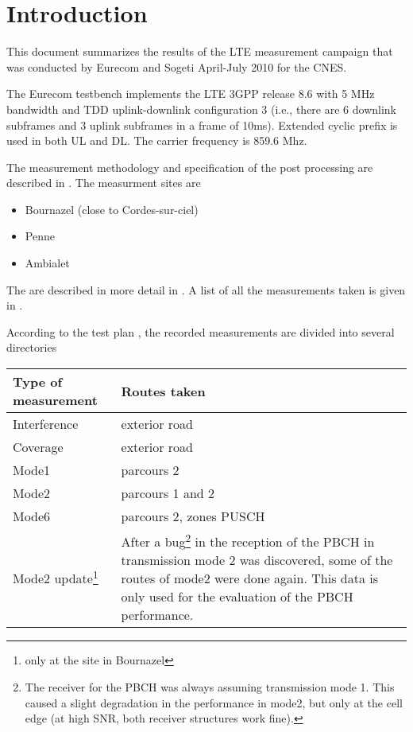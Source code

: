 \documentclass[a4paper,10pt]{article}
\begin{document}
\section{Introduction}

This document summarizes the results of the LTE measurement campaign that was conducted by Eurecom and Sogeti April-July 2010 for the CNES.

The Eurecom testbench implements the LTE 3GPP release 8.6 \cite{3gpp_docs} with 5 MHz bandwidth and TDD uplink-downlink configuration 3 (i.e., there are 6 downlink subframes and 3 uplink subframes in a frame of 10ms). Extended cyclic prefix is used in both UL and DL. The carrier frequency is 859.6 Mhz. 
 
The measurement methodology and specification of the post processing are described in \cite{measurments_spec}. The measurment sites are 
\begin{itemize}
 \item Bournazel (close to Cordes-sur-ciel)
 \item Penne
 \item Ambialet
\end{itemize}
The are described in more detail in \cite{cordes_desc,penne_desc,ambialet_desc}. A list of all the measurements taken is given in \cite{measurments_spreadsheet}. 

According to the test plan \cite{}, the recorded measurements are divided into several directories
\begin{center}
\begin{tabular}{l|p{6cm}}
Type of measurement & Routes taken \\ 
\hline
Interference & exterior road \\ 
Coverage & exterior road \\ 
Mode1 & parcours 2 \\ 
Mode2 & parcours 1 and 2 \\ 
Mode6 & parcours 2, zones PUSCH \\ 
Mode2 update\footnote{only at the site in Bournazel} & After a bug\footnote{The receiver for the PBCH was always assuming transmission mode 1. This caused a slight degradation in the performance in mode2, but only at the cell edge (at high SNR, both receiver structures work fine).} in the reception of the PBCH in transmission mode 2 was discovered, some of the routes of mode2 were done again. This data is only used for the evaluation of the PBCH performance. 
\end{tabular}
\end{center}
\end{document}
